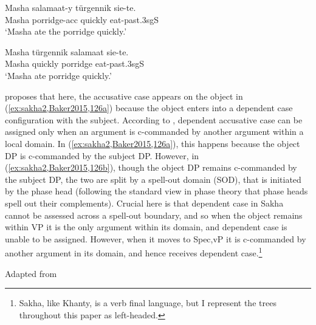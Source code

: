 \documentclass[output=paper
,modfonts
,nonflat]{langsci/langscibook}
\begin{document}
\begin{exe}
\ex {} \label{ex:sakha2,Baker2015,1262}
\begin{xlist}
\ex
\gll Masha salamaat-y türgennik sie-te.\\
Masha porridge-{\sc acc} quickly eat-{\sc past.3sgS}\\
\glt `Masha ate the porridge quickly.' \label{ex:sakha2,Baker2015,126a}

\ex
\gll Masha türgennik salamaat sie-te.\\
Masha quickly porridge eat-{\sc past.3sgS}\\
\glt `Masha ate porridge quickly.'\label{ex:sakha2,Baker2015,126b}
\end{xlist}
\end{exe}


\noindent \citeauthor{Baker2015} proposes that here, the accusative case appears on the object in (\ref{ex:sakha2,Baker2015,126a}) because the object enters into a dependent case configuration with the subject. 
According to \citeauthor{Baker2015}, dependent accusative case can be assigned only when an argument is c-commanded by another argument within a local domain. 
In (\ref{ex:sakha2,Baker2015,126a}), this happens because the object DP is c-commanded by the subject DP. 
However, in (\ref{ex:sakha2,Baker2015,126b}), though the object DP remains c-commanded by the subject DP, the two are split by a spell-out domain (SOD), that is initiated by the phase head (following the standard view in phase theory that phase heads spell out their complements).\largerpage 
Crucial here is that dependent case in Sakha cannot be assessed across a spell-out boundary, and so when the object remains within VP it is the only argument within its domain, and dependent case is unable to be assigned. However, when it moves to Spec,vP it is c-commanded by another argument in its domain, and hence receives dependent case.{\footnote{Sakha, like Khanty, is a verb final language, but I represent the trees throughout this paper as left-headed.}}


\begin{exe}
\ex Adapted from \citet[][126]{Baker2015}\\
\end{exe}
\end{document}
